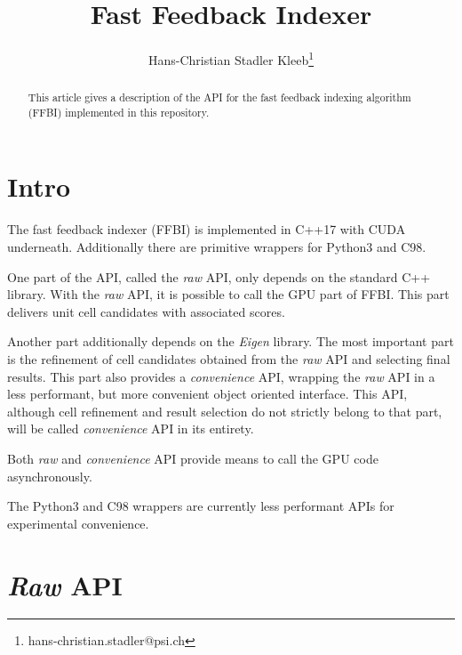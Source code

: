 \documentclass[a4paper,10pt]{article}
\title{Fast Feedback Indexer}
\author{Hans-Christian Stadler Kleeb\thanks{hans-christian.stadler@psi.ch}}
\begin{document}
\maketitle

\begin{abstract}
This article gives a description of the API for the fast feedback indexing algorithm (FFBI) implemented in this repository.
\end{abstract}

\section{Intro}\label{sec:intro}

The fast feedback indexer (FFBI) is implemented in C++17 with CUDA underneath. Additionally there are primitive wrappers for Python3 and C98.

One part of the API, called the \emph{raw} API, only depends on the standard C++ library. With the \emph{raw} API, it is possible to call the GPU part of FFBI. This part delivers unit cell candidates with associated scores.

Another part additionally depends on the \emph{Eigen} library. The most important part is the refinement of cell candidates obtained from the \emph{raw} API and selecting final results. This part also provides a \emph{convenience} API, wrapping the \emph{raw} API in a less performant, but more convenient object oriented interface. This API, although cell refinement and result selection do not strictly belong to that part, will be called \emph{convenience} API in its entirety.

Both \emph{raw} and \emph{convenience} API provide means to call the GPU code asynchronously.

The Python3 and C98 wrappers are currently less performant APIs for experimental convenience.

\section{\emph{Raw} API}
\lstset{language=C++}
\end{document}
